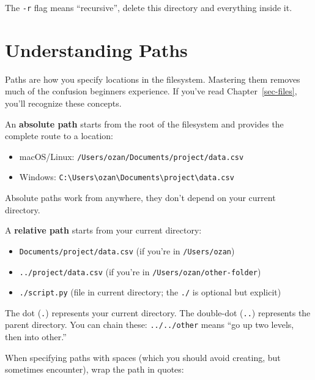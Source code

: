 \documentclass[
  letterpaper,
  DIV=11,
  numbers=noendperiod]{scrreprt}
\newenvironment{Shaded}{\begin{snugshade}}{\end{snugshade}}
\newcommand{\ExtensionTok}[1]{\textcolor[rgb]{0.00,0.23,0.31}{#1}}
\newcommand{\NormalTok}[1]{\textcolor[rgb]{0.00,0.23,0.31}{#1}}
\newcommand{\StringTok}[1]{\textcolor[rgb]{0.13,0.47,0.30}{#1}}
\providecommand{\tightlist}{%
  \setlength{\itemsep}{0pt}\setlength{\parskip}{0pt}}
\begin{document}
The \texttt{-r} flag means ``recursive'', delete this directory and
everything inside it.

\section{Understanding Paths}\label{understanding-paths-1}

Paths are how you specify locations in the filesystem. Mastering them
removes much of the confusion beginners experience. If you've read
Chapter~\ref{sec-files}, you'll recognize these concepts.

An \textbf{absolute path} starts from the root of the filesystem and
provides the complete route to a location:

\begin{itemize}
\tightlist
\item
  macOS/Linux: \texttt{/Users/ozan/Documents/project/data.csv}
\item
  Windows:
  \texttt{C:\textbackslash{}Users\textbackslash{}ozan\textbackslash{}Documents\textbackslash{}project\textbackslash{}data.csv}
\end{itemize}

Absolute paths work from anywhere, they don't depend on your current
directory.

A \textbf{relative path} starts from your current directory:

\begin{itemize}
\tightlist
\item
  \texttt{Documents/project/data.csv} (if you're in
  \texttt{/Users/ozan})
\item
  \texttt{../project/data.csv} (if you're in
  \texttt{/Users/ozan/other-folder})
\item
  \texttt{./script.py} (file in current directory; the \texttt{./} is
  optional but explicit)
\end{itemize}

The dot (\texttt{.}) represents your current directory. The double-dot
(\texttt{..}) represents the parent directory. You can chain these:
\texttt{../../other} means ``go up two levels, then into other.''

When specifying paths with spaces (which you should avoid creating, but
sometimes encounter), wrap the path in quotes:

\begin{codelisting}

\caption{\texttt{terminal}}

\begin{Shaded}
\end{Shaded}

\end{codelisting}
\end{document}
